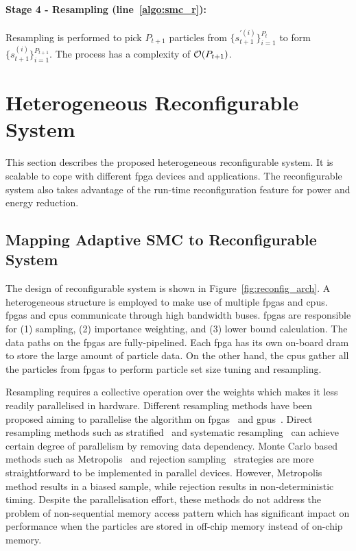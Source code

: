 \paragraph{Stage 4 - Resampling (line~\ref{algo:smc_r}): }

Resampling is performed to pick $P_{t+1}$ particles from $\{s_{t+1}^{'(i)}\}^{P_t}_{i=1}$ to form $\{s_{t+1}^{(i)}\}^{P_{t+1}}_{i=1}$.
The process has a complexity of $\mathop{}\mathopen{}\mathcal{O}\mathopen{}\left(P_{t+1}\right)$.

\section{Heterogeneous Reconfigurable System}
\label{sec:reconfig_hrs}

This section describes the proposed heterogeneous reconfigurable system.
It is scalable to cope with different \gls{fpga} devices and applications.
The reconfigurable system also takes advantage of the run-time reconfiguration feature for power and energy reduction.

\subsection{Mapping Adaptive SMC to Reconfigurable System}
\label{sec:reconfig_arch}

The design of reconfigurable system is shown in Figure~\ref{fig:reconfig_arch}.
A heterogeneous structure is employed to make use of multiple \glspl{fpga} and \glspl{cpu}.
\glspl{fpga} and \glspl{cpu} communicate through high bandwidth buses.
\glspl{fpga} are responsible for (1) sampling, (2) importance weighting, and (3) lower bound calculation.
The data paths on the \glspl{fpga} are fully-pipelined.
Each \gls{fpga} has its own on-board \gls{dram} to store the large amount of particle data.
On the other hand, the \glspl{cpu} gather all the particles from \glspl{fpga} to perform particle set size tuning and resampling.

Resampling requires a collective operation over the weights which makes it less readily parallelised in hardware.
Different resampling methods have been proposed aiming to parallelise the algorithm on \glspl{fpga}~\cite{bolic05} and \glspl{gpu}~\cite{murray14}.
Direct resampling methods such as stratified~\cite{sarndal03} and systematic resampling~\cite{douc05} can achieve certain degree of parallelism by removing data dependency.
Monte Carlo based methods such as Metropolis~\cite{metropolis53} and rejection sampling~\cite{neal03} strategies are more straightforward to be implemented in parallel devices.
However, Metropolis method results in a biased sample, while rejection results in non-deterministic timing.
Despite the parallelisation effort, these methods do not address the problem of non-sequential memory access pattern which has significant impact on performance when the particles are stored in off-chip memory instead of on-chip memory.

